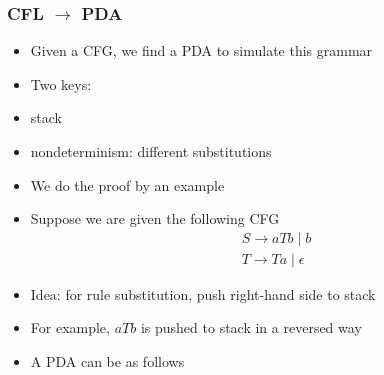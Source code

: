\begin{frame}[allowframebreaks]
\begin{itemize}
\end{itemize}\end{frame} \begin{frame}[allowframebreaks] \frametitle{CFL $\rightarrow$ PDA}
    \begin{itemize}
    \item Given a CFG, we find a PDA to simulate this grammar
      
\item Two keys:

\item [] stack 

\item [] nondeterminism: different substitutions

  
\item We do the proof by an example
\item Suppose we are given the following
  CFG
  \begin{equation*}
    \begin{split}
      & S \rightarrow aTb \mid b\\
      & T \rightarrow Ta \mid \epsilon
    \end{split}
  \end{equation*}

\item Idea: for rule substitution, push right-hand side to stack

\item [] For example, $aTb$ is pushed to stack in a reversed way

  \item
  A PDA can be as follows


\end{itemize}
\end{frame}
